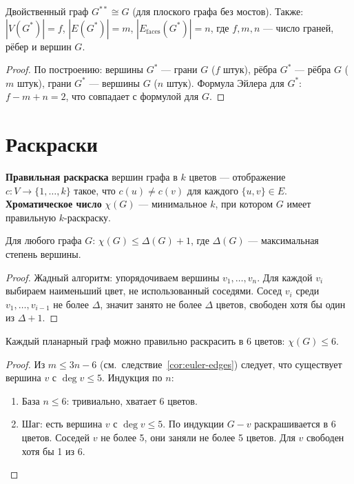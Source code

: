 \documentclass[12pt]{article}
\begin{document}
\begin{theorem}
Двойственный граф $G^{**} \cong G$ (для плоского графа без мостов).
Также: $|V(G^*)| = f$, $|E(G^*)| = m$, $|E_{\text{faces}}(G^*)| = n$,
где $f, m, n$ --- число граней, рёбер и вершин $G$.
\end{theorem}

\begin{proof}
По построению: вершины $G^*$ --- грани $G$ ($f$ штук),
рёбра $G^*$ --- рёбра $G$ ($m$ штук), грани $G^*$ ---
вершины $G$ ($n$ штук). Формула Эйлера для $G^*$:
$f - m + n = 2$, что совпадает с формулой для $G$.
\end{proof}

\section{Раскраски}

\begin{definition}
\textbf{Правильная раскраска} вершин графа в $k$ цветов ---
отображение $c\colon V \to \{1,\ldots,k\}$ такое, что
$c(u) \neq c(v)$ для каждого $\{u,v\} \in E$.
\textbf{Хроматическое число} $\chi(G)$ --- минимальное $k$,
при котором $G$ имеет правильную $k$-раскраску.
\end{definition}

\begin{theorem}
Для любого графа $G$: $\chi(G) \leq \Delta(G) + 1$,
где $\Delta(G)$ --- максимальная степень вершины.
\end{theorem}

\begin{proof}
Жадный алгоритм: упорядочиваем вершины $v_1,\ldots,v_n$.
Для каждой $v_i$ выбираем наименьший цвет, не использованный
соседями. Сосед $v_i$ среди $v_1,\ldots,v_{i-1}$ не более $\Delta$,
значит занято не более $\Delta$ цветов, свободен хотя бы один
из $\Delta+1$.
\end{proof}

\begin{theorem}
Каждый планарный граф можно правильно раскрасить в 6 цветов:
$\chi(G) \leq 6$.
\end{theorem}

\begin{proof}
Из $m \leq 3n-6$ (см.~следствие~\ref{cor:euler-edges}) следует, что существует вершина $v$ с $\deg v \leq 5$.
Индукция по $n$:
\begin{enumerate}
\item База $n \leq 6$: тривиально, хватает 6 цветов.
\item Шаг: есть вершина $v$ с $\deg v \leq 5$.
      По индукции $G - v$ раскрашивается в 6 цветов.
      Соседей $v$ не более 5, они заняли не более 5 цветов.
      Для $v$ свободен хотя бы 1 из 6.
\end{enumerate}
\end{proof}
\end{document}
